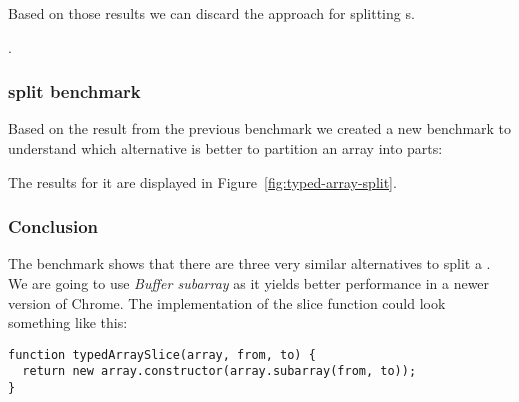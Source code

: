 Based on those results we can discard the  approach for splitting \ttarray{}s.

.

\subsubsection{\ttarray{} split benchmark}
Based on the result from the previous benchmark we created a new benchmark to understand which alternative is better to partition an array into parts:

The results for it are displayed in Figure~\ref{fig:typed-array-split}.

\subsubsection{Conclusion}
The benchmark shows that there are three very similar alternatives to split a \ttarray{}. We are going to use \textit{Buffer subarray} as it yields better performance in a newer version of Chrome. The implementation of the slice function could look something like this:
\begin{lstlisting}[caption=Function to benchmark]
function typedArraySlice(array, from, to) {
  return new array.constructor(array.subarray(from, to));
}
\end{lstlisting}

\pagebreak